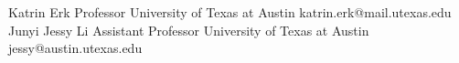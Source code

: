 %
%
%


\begin{referees}
		{Katrin Erk}
		{Professor}
		{University of Texas at Austin}
		{katrin.erk@mail.utexas.edu}
		{Junyi Jessy Li}
		{Assistant Professor}
		{University of Texas at Austin}
		{jessy@austin.utexas.edu}

\end{referees}